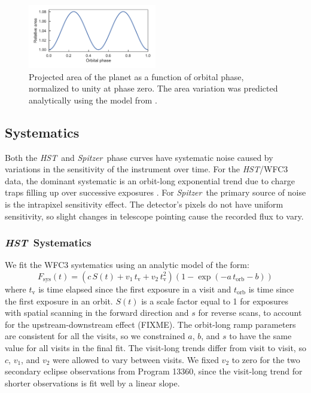 \documentclass[twocolumn]{aastex61}
\newcommand{\project}[1]{\textsl{#1}}
\newcommand{\HST}{\project{HST}}
\newcommand{\Spitzer}{\project{Spitzer}}
\begin{document}



\begin{figure}
\includegraphics[width = 0.5\textwidth]{Figures/ellipsoidal.pdf}
\caption{Projected area of the planet as a function of orbital phase, normalized to unity at phase zero. The area variation was predicted analytically using the model from \citep{leconte11b}.}
\label{fig:ellipsoidal}
\end{figure}


\subsection{Systematics}
Both the \HST\ and \Spitzer\ phase curves have systematic noise caused by variations in the sensitivity of the instrument over time. For the \HST/WFC3 data, the dominant systematic is an orbit-long exponential trend due to charge traps filling up over successive exposures \citep{long15, zhu17}. For \Spitzer\, the primary source of noise is the intrapixel sensitivity effect. The detector's pixels do not have uniform sensitivity, so slight changes in telescope pointing cause the recorded flux to vary. 

\subsubsection{\HST\ Systematics}
\label{sec:hst_sys}
We fit the WFC3 systematics using an analytic model of the form:
\begin{equation}
 F_\mathrm{sys}(t) = (c\,S(t) + v_1\,t_\mathrm{v} + v_2\,t_\mathrm{v}^2)(1 - \exp(-a\,t_\mathrm{orb} - b))
\end{equation}
where $t_\mathrm{v}$ is time elapsed since the first exposure in a visit and $t_\mathrm{orb}$ is time since the first exposure in an orbit. $S(t)$ is a scale factor equal to 1 for exposures with spatial scanning in the forward direction and $s$ for reverse scans, to account for the upstream-downstream effect (FIXME). The orbit-long ramp parameters are consistent for all the visits, so we constrained $a$, $b$, and $s$ to have the same value for all visits in the final fit. The visit-long trends differ from visit to visit, so $c$, $v_1$, and $v_2$ were allowed to vary between visits. We fixed $v_2$ to zero for the two secondary eclipse observations from Program 13360, since the visit-long trend for shorter observations is fit well by a linear slope.
\end{document}
